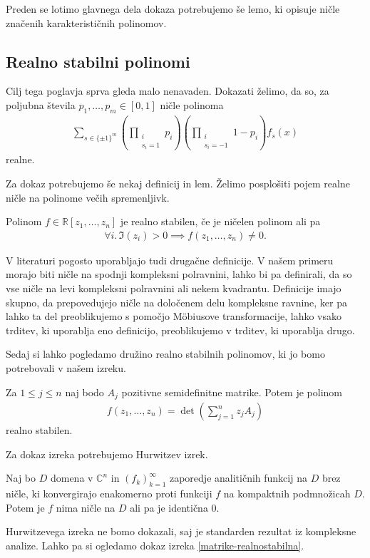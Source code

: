 Preden se lotimo glavnega dela dokaza potrebujemo še lemo, ki opisuje ničle značenih karakterističnih polinomov.

\subsection{Realno stabilni polinomi}
Cilj tega poglavja sprva gleda malo nenavaden. Dokazati želimo, da so, za poljubna števila \(p_1, \ldots, p_m \in [0,1]\) ničle polinoma
\begin{align*}
    \sum_{s\in \{\pm 1\}^m} \left(\prod_{\substack{i\\s_i=1}} p_i\right) \left(\prod_{\substack{i\\s_i=-1}} 1- p_i\right) f_s(x)
\end{align*}
realne.

Za dokaz potrebujemo še nekaj definicij in lem. Želimo posplošiti pojem realne ničle na polinome večih spremenljivk.
\begin{definicija}
    Polinom \(f\in \mathbb R[z_1, \ldots, z_n]\) je realno stabilen, če je ničelen polinom ali pa
    \begin{align*}
        \forall i.\, \Im(z_i) > 0 \implies f(z_1, \ldots, z_n) \neq 0.
    \end{align*}
\end{definicija}
V literaturi pogosto uporabljajo tudi drugačne definicije. V našem primeru morajo biti ničle na spodnji kompleksni polravnini, lahko bi pa definirali, da so vse ničle na levi kompleksni polravnini ali nekem kvadrantu. Definicije imajo skupno, da prepovedujejo ničle na določenem delu kompleksne ravnine, ker pa lahko ta del preoblikujemo s pomočjo Möbiusove transformacije, lahko vsako trditev, ki uporablja eno definicijo, preoblikujemo v trditev, ki uporablja drugo\cite{mckenzie}.

Sedaj si lahko pogledamo družino realno stabilnih polinomov, ki jo bomo potrebovali v našem izreku\cite{JuliusPetter}.
\begin{izrek}\label{matrike-realnostabilna}
    Za \(1\leq j \leq n\) naj bodo \(A_j\) pozitivne semidefinitne matrike. Potem je polinom
    \begin{align*}
        f(z_1, \ldots, z_n) = \det\left(\sum_{j=1}^n z_j A_j\right)
    \end{align*}
    realno stabilen.
\end{izrek}
Za dokaz izreka potrebujemo Hurwitzev izrek\cite{freitag1}.
\begin{izrek}
    Naj bo \(D\) domena v \(\mathbb C^n\) in \((f_k)_{k=1}^\infty\) zaporedje analitičnih funkcij na \(D\) brez ničle, ki konvergirajo enakomerno proti funkciji \(f\) na kompaktnih podmnožicah \(D\). Potem je \(f\) nima ničle na \(D\) ali pa je identična \(0\).
\end{izrek}
Hurwitzevega izreka ne bomo dokazali, saj je standarden rezultat iz kompleksne analize. Lahko pa si ogledamo dokaz izreka \ref{matrike-realnostabilna}.
\begin{dokaz}
\end{dokaz}

